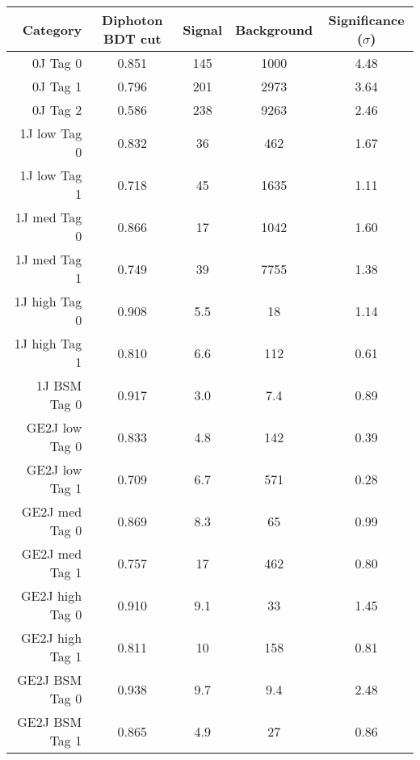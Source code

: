\begin{tabular}{ r | c | c | c | c } 
\hline 
Category         & Diphoton BDT cut & Signal & Background & Significance ($\sigma$) \\
\hline 
0J Tag 0         & 0.851            & 145    & 1000       & 4.48                    \\
0J Tag 1         & 0.796            & 201    & 2973       & 3.64                    \\
0J Tag 2         & 0.586            & 238    & 9263       & 2.46                    \\
\hline           
1J low  Tag 0    & 0.832            & 36     & 462        & 1.67                    \\
1J low  Tag 1    & 0.718            & 45     & 1635       & 1.11                    \\
1J med  Tag 0    & 0.866            & 17     & 1042       & 1.60                    \\
1J med  Tag 1    & 0.749            & 39     & 7755       & 1.38                    \\
1J high Tag 0    & 0.908            & 5.5    & 18         & 1.14                    \\
1J high Tag 1    & 0.810            & 6.6    & 112        & 0.61                    \\
1J BSM  Tag 0    & 0.917            & 3.0    & 7.4        & 0.89                    \\
\hline           
GE2J low  Tag 0  & 0.833            & 4.8    & 142        & 0.39                    \\
GE2J low  Tag 1  & 0.709            & 6.7    & 571        & 0.28                    \\
GE2J med  Tag 0  & 0.869            & 8.3    & 65         & 0.99                    \\
GE2J med  Tag 1  & 0.757            & 17     & 462        & 0.80                    \\
GE2J high Tag 0  & 0.910            & 9.1    & 33         & 1.45                    \\
GE2J high Tag 1  & 0.811            & 10     & 158        & 0.81                    \\
GE2J BSM  Tag 0  & 0.938            & 9.7    & 9.4        & 2.48                    \\
GE2J BSM  Tag 1  & 0.865            & 4.9    & 27         & 0.86                    \\
\hline 
\end{tabular}
